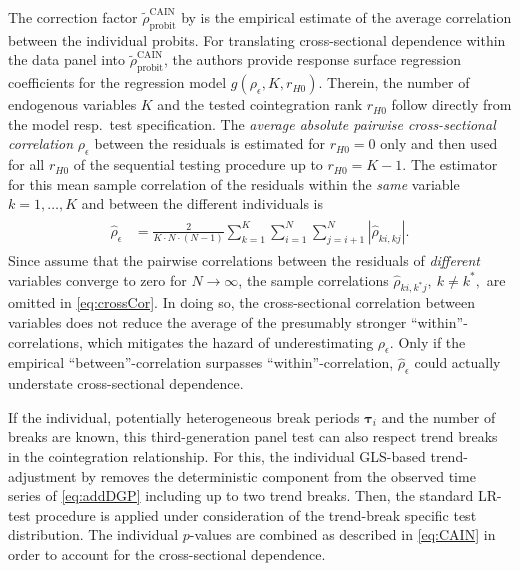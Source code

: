 The correction factor $ \tilde{\rho}^{\text{CAIN}}_\text{probit} $ by \citet{ArsovaOersal2021} is the empirical estimate of the average correlation between the individual probits. For translating cross-sectional dependence within the data panel into $ \tilde{\rho}^{\text{CAIN}}_\text{probit} $, the authors provide response surface regression coefficients for the regression model $ g\left( \rho_\epsilon, K, r_{H0} \right) $. Therein, the number of endogenous variables $ K $ and the tested cointegration rank $ r_{H0} $ follow directly from the model resp.~test specification. The \textit{average absolute pairwise cross-sectional correlation} $ \rho_\epsilon $ between the residuals is estimated for $ r_{H0} = 0 $ only and then used for all $ r_{H0} $ of the sequential testing procedure up to $ r_{H0} = K-1 $. The estimator for this mean sample correlation of the residuals within the \textit{same} variable $ k=1,\ldots,K $ and between the different individuals is
\begin{align} \label{eq:crossCor}
\begin{split}
	\hat{\rho}_\epsilon & = \frac{2}{K \cdot N \cdot (N-1)} \sum_{k=1}^{K} \sum_{i=1}^{N} \sum_{j=i+1}^{N} | \hat{\rho}_{ki,kj} |. 
\end{split}
\end{align}
Since \citet{ArsovaOersal2021} assume that the pairwise correlations between the residuals of \textit{different} variables converge to zero for $ N \to \infty $, the sample correlations $ \hat{\rho}_{ki,k^*j}, \ k \neq k^*, $ are omitted in \eqref{eq:crossCor}. In doing so, the cross-sectional correlation between variables does not reduce the average of the presumably stronger ``within''-correlations, which mitigates the hazard of underestimating $ \rho_\epsilon $. Only if the empirical ``between''-correlation surpasses ``within''-correlation, $ \hat{\rho}_\epsilon $ could actually understate cross-sectional dependence.

If the individual, potentially heterogeneous break periods $ \boldsymbol{\tau}_i $ and the number of breaks are known, this third-generation panel test can also respect trend breaks in the cointegration relationship. For this, the individual GLS-based trend-adjustment by \citet{TrenklerEtAl2008} removes the deterministic component from the observed time series of \eqref{eq:addDGP} including up to two trend breaks. Then, the standard LR-test procedure is applied under consideration of the trend-break specific test distribution. The individual $p$-values are combined as described in \eqref{eq:CAIN} in order to account for the cross-sectional dependence.



